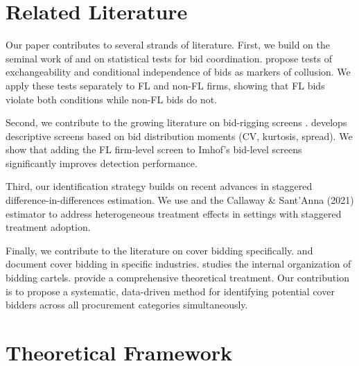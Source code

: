\documentclass[10pt]{article}
\begin{document}
\section{Related Literature}
\label{sec:literature}

Our paper contributes to several strands of literature. First, we build on the seminal work of \citet{bajari2003deciding} and \citet{porter1993detection} on statistical tests for bid coordination. \citet{bajari2003deciding} propose tests of exchangeability and conditional independence of bids as markers of collusion. We apply these tests separately to FL and non-FL firms, showing that FL bids violate both conditions while non-FL bids do not.

Second, we contribute to the growing literature on bid-rigging screens \citep{imhof2019detecting, imhof2018screening, abrantesmetz2006a, hüschelrath2014cartel}. \citet{imhof2019detecting} develops descriptive screens based on bid distribution moments (CV, kurtosis, spread). We show that adding the FL firm-level screen to Imhof's bid-level screens significantly improves detection performance.

Third, our identification strategy builds on recent advances in staggered difference-in-differences estimation. We use \citet{sun2021estimating} and the Callaway \& Sant'Anna (2021) estimator to address heterogeneous treatment effects in settings with staggered treatment adoption.

Finally, we contribute to the literature on cover bidding specifically. \citet{porter1999ohio} and \citet{pesendorfer2000study} document cover bidding in specific industries. \citet{asker2010leniency} studies the internal organization of bidding cartels. \citet{marshall2012economics} provide a comprehensive theoretical treatment. Our contribution is to propose a systematic, data-driven method for identifying potential cover bidders across all procurement categories simultaneously.

\section{Theoretical Framework}
\label{sec:theory}
\end{document}
